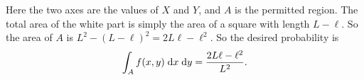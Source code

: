 \begin{note}
\begin{field}
\begin{eg}
\begin{center}
      \end{center}
      Here the two axes are the values of $X$ and $Y$, and $A$ is the permitted region. The total area of the white part is simply the area of a square with length $L - \ell$. So the area of $A$ is $L^2 - (L - \ell)^2 = 2L\ell - \ell^2$. So the desired probability is
      \[
        \int_A f(x, y)\;\mathrm{d} x\;\mathrm{d} y = \frac{2L\ell - \ell^2}{L^2}.
      \]
    \end{eg}
  \end{field}
  \xplain{}%
\end{note}

